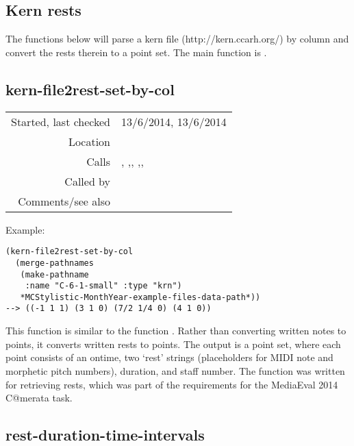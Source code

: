 \subsection{Kern rests}\label{sec:kern-rests}

The functions below will parse a kern file
(http://kern.ccarh.org/) by column and convert the
rests therein to a point set. The main function is
.


\subsection*{kern-file2rest-set-by-col}\label{fun:kern-file2rest-set-by-col}

\vspace{0.3cm}
\begin{tabular}{r|p{8cm}}
Started, last checked & 13/6/2014, 13/6/2014 \\
Location & \nameref{sec:kern-rests} \\
Calls & \nameref{fun:kern-anacrusis-correction}, \nameref{fun:kern-col2rest-set},\newline \nameref{fun:read-from-file-arbitrary}, \nameref{fun:sort-dataset-asc},\newline \nameref{fun:staves-info2staves-variable-robust},\newline \nameref{fun:tab-separated-string2list} \\
Called by & \\
Comments/see also &
\end{tabular}

\vspace{0.5cm}
\noindent Example:
\begin{verbatim}
(kern-file2rest-set-by-col
  (merge-pathnames
   (make-pathname
    :name "C-6-1-small" :type "krn")
   *MCStylistic-MonthYear-example-files-data-path*))
--> ((-1 1 1) (3 1 0) (7/2 1/4 0) (4 1 0))
\end{verbatim}

\noindent This function is similar to the function
. Rather than
converting written notes to points, it converts
written rests to points. The output is a point set,
where each point consists of an ontime, two `rest'
strings (placeholders for MIDI note and morphetic
pitch numbers), duration, and staff number. The
function was written for retrieving rests, which was
part of the requirements for the MediaEval 2014
C@merata task.


\subsection*{rest-duration-time-intervals}\label{fun:rest-duration-time-intervals}

